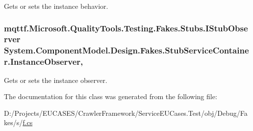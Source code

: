 Gets or sets the instance behavior.

\hypertarget{class_system_1_1_component_model_1_1_design_1_1_fakes_1_1_stub_service_container_a8b028dbc4904a5af84eb23023e6b321a}{
\subsubsection[{Instance\-Observer}]{\setlength{\rightskip}{0pt plus 5cm}mqttf.\-Microsoft.\-Quality\-Tools.\-Testing.\-Fakes.\-Stubs.\-I\-Stub\-Observer System.\-Component\-Model.\-Design.\-Fakes.\-Stub\-Service\-Container.\-Instance\-Observer\hspace{0.3cm}{\ttfamily [get]}, {\ttfamily [set]}}}\label{class_system_1_1_component_model_1_1_design_1_1_fakes_1_1_stub_service_container_a8b028dbc4904a5af84eb23023e6b321a}


Gets or sets the instance observer.



The documentation for this class was generated from the following file\-:\begin{DoxyCompactItemize}
\item 
D\-:/\-Projects/\-E\-U\-C\-A\-S\-E\-S/\-Crawler\-Framework/\-Service\-E\-U\-Cases.\-Test/obj/\-Debug/\-Fakes/s/\hyperlink{s_2f_8cs}{f.\-cs}\end{DoxyCompactItemize}
